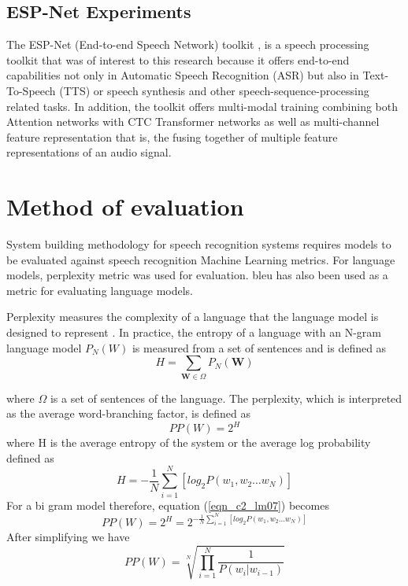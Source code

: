 \subsection{ESP-Net Experiments}\label{c3sec_espnet}
The ESP-Net (End-to-end Speech Network) toolkit \citep{watanabe2018espnet}, is a speech processing toolkit that was of interest to this research because it offers end-to-end capabilities not only in Automatic Speech Recognition (ASR) but also in Text-To-Speech (TTS) or speech synthesis and other speech-sequence-processing related tasks.  In addition, the toolkit offers multi-modal training combining both Attention networks \cite{vaswani2017attention} with CTC Transformer networks as well as multi-channel feature representation that is, the fusing together of multiple feature representations of an audio signal.

\section{Method of evaluation}
System building methodology \citep{nunamaker1990systems} for speech recognition systems requires models to be evaluated against speech recognition Machine Learning metrics.  For language models, perplexity metric was used for evaluation.  \acrfull{bleu}\citep{papineni2002bleu} has also been used as a metric for evaluating language models.

Perplexity measures the complexity of a language that the language model is designed to represent \citep{1976jelinekcontinuous}. In practice, the entropy of a language with an N-gram language model $P_N(W)$ is measured from a set of sentences and is defined as
\begin{equation}H=\sum_{\mathbf{W}\in\Omega}P_N(\mathbf{W})
\label{eqn_c2_lm05}
\end{equation}

where $\Omega$ is a set of sentences of the language. The perplexity, which is interpreted as the average word-branching factor, is defined as
\begin{equation}PP(W)=2^H
\label{eqn_c2_lm06}
\end{equation}
where H is the average entropy of the system or the average log probability defined as
\begin{equation}
H=-\frac{1}{N}\sum_{i=1}^N[log_2P(w_1,w_2\dots w_N)]
\label{eqn_c2_lm07}
\end{equation}
For a bi gram model therefore, equation (\ref{eqn_c2_lm07}) becomes
\begin{equation}
PP(W)=2^H=2^{-\frac{1}{N}\sum_{i=1}^N[log_2P(w_1,w_2\dots w_N)]}
\label{eqn_c2_lm08}
\end{equation}
After simplifying we have
\begin{equation}
PP(W)=\sqrt[N]{\prod_{i=1}^N\frac{1}{P(w_i|w_{i-1})}}
\label{eqn_c2_lm09}
\end{equation}


